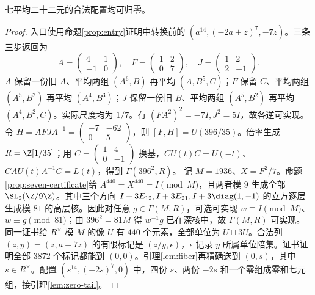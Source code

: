 \begin{lemma}\label{lem:seven22}
七平均二十二元的合法配置均可归零。
\end{lemma}
\begin{proof}
入口使用命题\ref{prop:entry}证明中转换前的 $(a^{14},(-2a+z)^7,-7z)$。三条三步返回为
\[
A=\begin{pmatrix}4&1\\-1&0\end{pmatrix},\quad
F=\begin{pmatrix}1&2\\0&7\end{pmatrix},\quad
J=\begin{pmatrix}1&2\\2&-1\end{pmatrix}.
\]
$A$ 保留一份旧 $A$、平均两组 $(A^6,B)$ 再平均 $(A,B^5,C)$；$F$ 保留 $C$、平均两组 $(A^5,B^2)$ 再平均 $(A^4,B^3)$；$J$ 保留一份旧 $B$、平均两组 $(A^5,B^2)$ 再平均 $(A^4,B^2,C)$。实际尺度均为 $1/7$。有 $(FA^2)^2=-7I,J^2=5I$，故各逆可实现。
令 $H=AFJA^{-1}=\left(\begin{smallmatrix}-7&-62\\0&5\end{smallmatrix}\right)$，则 $[F,H]=U(396/35)$。倍率生成 $R=\Z[1/35]$；用 $C=\left(\begin{smallmatrix}1&4\\0&-1\end{smallmatrix}\right)$ 换基，$CU(t)C=U(-t)$、$CAU(t)A^{-1}C=L(t)$，得到 $\Gamma(396^2,R)$。
记 $M=1936$、$X=F^2/7$。命题\ref{prop:seven-certificate}给 $A^{440}=X^{440}=I\pmod M$，且两者模 $9$ 生成全部 $\SL_2(\Z/9\Z)$。其中三个方向 $I+3E_{12},I+3E_{21},I+3\diag(1,-1)$ 的立方逐层生成模 $81$ 的高层核。因此对任意 $g\in\Gamma(M,R)$，可选可实现 $w\equiv I\pmod M$、$w\equiv g\pmod{81}$；由 $396^2=81M$ 得 $w^{-1}g$ 已在深核中，故 $\Gamma(M,R)$ 可实现。
同一证书给 $R^\times$ 模 $M$ 的像 $U$ 有 $440$ 个元素，全部单位为 $U\sqcup3U$。合法列 $(z,y)=(z,a+7z)$ 的有限标记是 $(z/y,\epsilon)$，$\epsilon$ 记录 $y$ 所属单位陪集。证书证明全部 $3872$ 个标记都能到 $(0,0)$。引理\ref{lem:fiber}再精确送到 $(0,s)$，其中 $s\in R^\times$。配置 $(s^{14},(-2s)^7,0)$ 中，四份 $s$、两份 $-2s$ 和一个零组成零和七元组，接引理\ref{lem:zero-tail}。
\end{proof}

